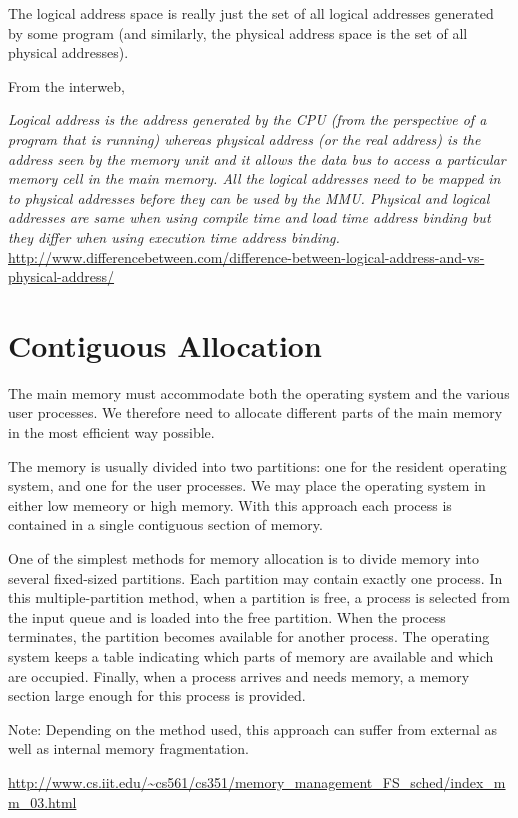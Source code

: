 \documentclass{article}
\begin{document}
The logical address space is really just the set of all logical addresses generated by some program (and similarly, the physical address space is the set of all physical addresses). 

From the interweb, 

\emph{
Logical address is the address generated by the CPU (from the perspective of a program that is running) whereas physical address (or the real address) is the address seen by the memory unit and it allows the data bus to access a particular memory cell in the main memory. All the logical addresses need to be mapped in to physical addresses before they can be used by the MMU. Physical and logical addresses are same when using compile time and load time address binding but they differ when using execution time address binding.
}
\url{http://www.differencebetween.com/difference-between-logical-address-and-vs-physical-address/}

\section{Contiguous Allocation}


The main memory must accommodate both the operating system and the various user processes. We therefore need to allocate different parts of the main memory in the most efficient way possible.

The memory is usually divided into two partitions: one for the resident operating system, and one for the user processes. We may place the operating system in either low memeory or high memory. With this approach each process is contained in a single contiguous section of memory.

One of the simplest methods for memory allocation is to divide memory into several fixed-sized partitions. Each partition may contain exactly one process. In this multiple-partition method, when a partition is free, a process is selected from the input queue and is loaded into the free partition. When the process terminates, the partition becomes available for another process. The operating system keeps a table indicating which parts of memory are available and which are occupied. Finally, when a process arrives and needs memory, a memory section large enough for this process is provided.

Note: Depending on the method used, this approach can suffer from external as well as internal memory fragmentation.

\url{http://www.cs.iit.edu/~cs561/cs351/memory_management_FS_sched/index_mm_03.html}
\end{document}
